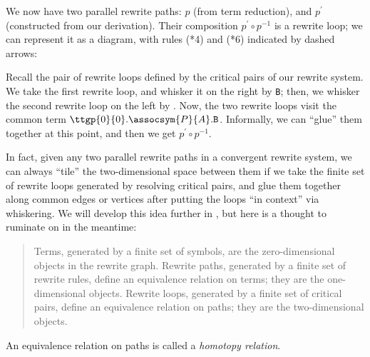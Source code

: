\documentclass[../generics]{subfiles}
\begin{document}
\begin{example}
We now have two parallel rewrite paths: $p$ (from term reduction), and $p^\prime$ (constructed from our derivation). Their composition $p^\prime\circ p^{-1}$ is a rewrite loop; we can represent it as a diagram, with rules (*4) and (*6) indicated by dashed arrows:
\begin{center}
\end{center}
Recall the pair of rewrite loops defined by the critical pairs of our rewrite system. We take the first rewrite loop, and whisker it on the right by \texttt{B}; then, we whisker the second rewrite loop on the left by . Now, the two rewrite loops visit the common term $\ttgp{0}{0}.\assocsym{P}{A}.\texttt{B}$. Informally, we can ``glue'' them together at this point, and then we get $p^\prime\circ p^{-1}$.

In fact, given any two parallel rewrite paths in a convergent rewrite system, we can always ``tile'' the two-dimensional space between them if we take the finite set of rewrite loops generated by resolving critical pairs, and glue them together along common edges or vertices after putting the loops ``in context'' via whiskering. We will develop this idea further in , but here is a thought to ruminate on in the meantime:
\begin{quote}
Terms, generated by a finite set of symbols, are the zero-dimensional objects in the rewrite graph. Rewrite paths, generated by a finite set of rewrite rules, define an equivalence relation on terms; they are the one-dimensional objects. Rewrite loops, generated by a finite set of critical pairs, define an equivalence relation on paths; they are the two-dimensional objects.
\end{quote}
An equivalence relation on paths is called a \emph{homotopy relation}.
\end{example}
\end{document}
